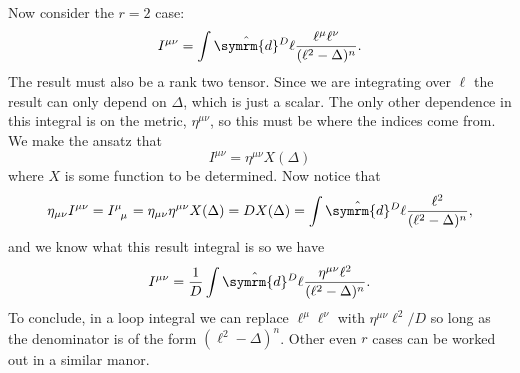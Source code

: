 \documentclass[fleqn]{NotesClass}
\newcommand{\dhat}[1]{\hat{\symrm{d}}{#1}}
\newcommand{\minkowskiMetric}{\eta}
\begin{document}
    Now consider the \(r = 2\) case:
    \begin{equation}
        I^{\mu\nu} = \int \dhat{^D\ell} \frac{\ell^\mu \ell^\nu}{(\ell^2 - \Delta)^n}.
    \end{equation}
    The result must also be a rank two tensor.
    Since we are integrating over \(\ell\) the result can only depend on \(\Delta\), which is just a scalar.
    The only other dependence in this integral is on the metric, \(\minkowskiMetric^{\mu\nu}\), so this must be where the indices come from.
    We make the ansatz that
    \begin{equation}
        I^{\mu\nu} = \minkowskiMetric^{\mu\nu} X(\Delta)
    \end{equation}
    where \(X\) is some function to be determined.
    Now notice that
    \begin{equation}
        \minkowskiMetric_{\mu\nu}I^{\mu\nu} = \tensor{I}{^\mu_\mu} = \minkowskiMetric_{\mu\nu}\minkowskiMetric^{\mu\nu}X(\Delta) = DX(\Delta) = \int \dhat{^D\ell} \frac{\ell^2}{(\ell^2 - \Delta)^n},
    \end{equation}
    and we know what this result integral is so we have
    \begin{equation}
        I^{\mu\nu} = \frac{1}{D} \int \dhat{^D\ell} \frac{\minkowskiMetric^{\mu\nu}\ell^2}{(\ell^2 - \Delta)^n}.
    \end{equation}
    To conclude, in a loop integral we can replace \(\ell^\mu \ell^\nu\) with \(\minkowskiMetric^{\mu\nu}\ell^2/D\) so long as the denominator is of the form \((\ell^2 - \Delta)^n\).
    Other even \(r\) cases can be worked out in a similar manor.
    
\end{document}
